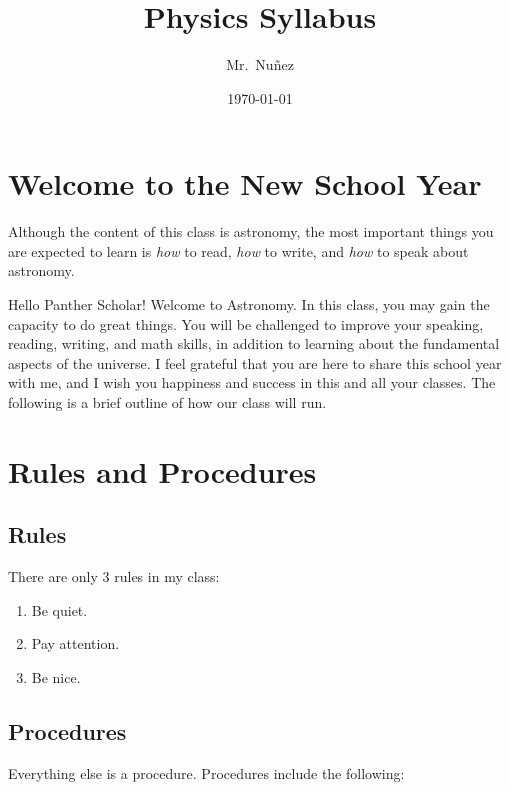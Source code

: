 \documentclass{article}
\title{Physics Syllabus}
\author{Mr.~Nu\~{n}ez}
\date{\today}
\begin{document}
\maketitle

\section{Welcome to the New School Year}

Although the content of this class is astronomy, the most important things you are expected to learn is \textit{how} to read, \textit{how} to write, and \textit{how} to speak about astronomy.

\vspace{1em}

Hello Panther Scholar! Welcome to Astronomy. In this class, you may gain the capacity to do great things. You will be challenged to improve your speaking, reading, writing, and math skills, in addition to learning about the fundamental aspects of the universe. I feel grateful that you are here to share this school year with me, and I wish you happiness and success in this and all your classes. The following is a brief outline of how our class will run.
\vspace{1em}

\section{Rules and Procedures}

\subsection{Rules}

There are only 3 rules in my class:
\vspace{-1ex}


\begin{enumerate}
\setlength\itemsep{0.1ex}
    \item Be quiet.
    \item Pay attention.
    \item Be nice.
\end{enumerate}

\subsection{Procedures}

Everything else is a procedure. Procedures include the following:
\vspace{-1ex}
\end{document}

